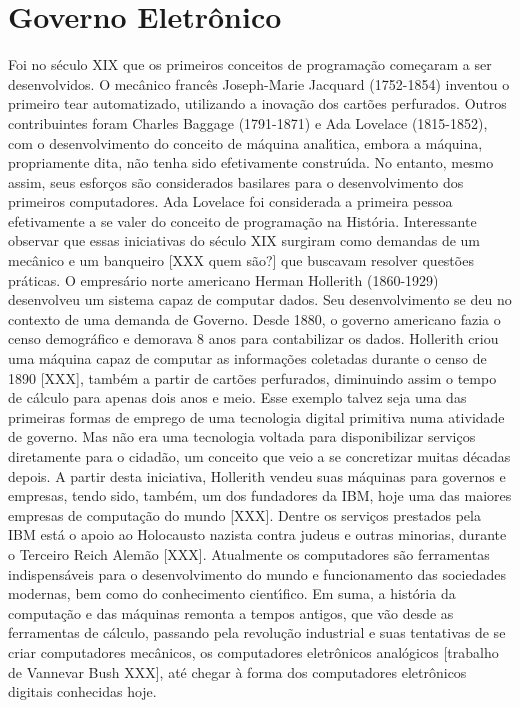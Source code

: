 \documentclass[
12pt,		%
openright,	%
twoside,  %
a4paper,			%
chapter=TITLE,		%
english,			%
french,				%
spanish,			%
brazil				%
]{USPSC-classe/USPSC}
\begin{document}
\section[Governo Eletr\^onico]{Governo Eletr\^onico}\label{Governo Eletr\^onico}
Foi no s\'eculo XIX que os primeiros conceitos de programa\c{c}\~ao come\c{c}aram a ser desenvolvidos. O mec\^anico franc\^es Joseph-Marie Jacquard (1752-1854) inventou o primeiro tear automatizado, utilizando a inova\c{c}\~ao dos cart\~oes perfurados. Outros contribuintes foram Charles Baggage (1791-1871) e Ada Lovelace (1815-1852), com o desenvolvimento do conceito de m\'aquina anal\'{\i}tica, embora a m\'aquina, propriamente dita, n\~ao tenha sido efetivamente constru\'{\i}da. No entanto, mesmo assim, seus esfor\c{c}os s\~ao considerados basilares para o desenvolvimento dos primeiros computadores. Ada Lovelace foi considerada a primeira pessoa efetivamente a se valer do conceito de programa\c{c}\~ao na Hist\'oria. Interessante observar que essas iniciativas do s\'eculo XIX surgiram como demandas de um mec\^anico e um banqueiro [XXX quem s\~ao?] que buscavam resolver quest\~oes pr\'aticas.
O empres\'ario norte americano Herman Hollerith (1860-1929) desenvolveu um sistema capaz de computar dados. Seu desenvolvimento se deu no contexto de uma demanda de Governo. Desde 1880, o governo americano fazia o censo demogr\'afico e demorava 8 anos para contabilizar os dados. Hollerith criou uma m\'aquina capaz de computar as informa\c{c}\~oes coletadas durante o censo de 1890 [XXX], tamb\'em a partir de cart\~oes perfurados, diminuindo assim o tempo de c\'alculo para apenas dois anos e meio. Esse exemplo talvez seja uma das primeiras formas de emprego de uma tecnologia digital primitiva numa atividade de governo. Mas n\~ao era uma tecnologia voltada para disponibilizar servi\c{c}os diretamente para o cidad\~ao, um conceito que veio a se concretizar muitas d\'ecadas depois.
A partir desta iniciativa, Hollerith vendeu suas m\'aquinas para governos e empresas, tendo sido, tamb\'em, um dos fundadores da IBM, hoje uma das maiores empresas de computa\c{c}\~ao do mundo [XXX]. Dentre os servi\c{c}os prestados pela IBM est\'a o apoio ao Holocausto nazista contra judeus e outras minorias, durante o Terceiro Reich Alem\~ao [XXX].
Atualmente os computadores s\~ao ferramentas indispens\'aveis para o desenvolvimento do mundo e funcionamento das sociedades modernas, bem como do conhecimento cient\'{\i}fico. Em suma, a hist\'oria da computa\c{c}\~ao e das m\'aquinas remonta a tempos antigos, que v\~ao desde as ferramentas de c\'alculo, passando pela revolu\c{c}\~ao industrial e suas tentativas de se criar computadores mec\^anicos, os computadores eletr\^onicos anal\'ogicos [trabalho de Vannevar Bush XXX], at\'e chegar \`a forma dos computadores eletr\^onicos digitais conhecidas hoje.
\end{document}
